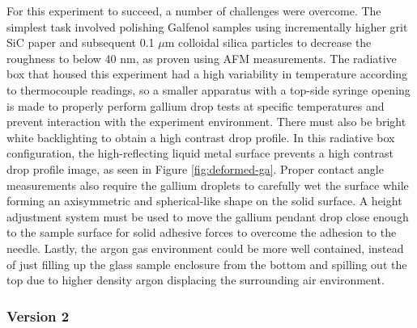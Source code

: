 For this experiment to succeed, a number of challenges were overcome. The simplest task involved polishing Galfenol samples using incrementally higher grit SiC paper and subsequent 0.1 $\mu$m colloidal silica particles to decrease the roughness to below 40 nm, as proven using AFM measurements. %
The radiative box that housed this experiment had a high variability in temperature according to thermocouple readings, so a smaller apparatus with a top-side syringe opening is made to properly perform gallium drop tests at specific temperatures and prevent interaction with the experiment environment. There must also be bright white backlighting to obtain a high contrast drop profile. In this radiative box configuration, the high-reflecting liquid metal surface prevents a high contrast drop profile image, as seen in Figure \ref{fig:deformed-ga}. Proper contact angle measurements also require the gallium droplets to carefully wet the surface while forming an axisymmetric and spherical-like shape on the solid surface. A height adjustment system must be used to move the gallium pendant drop close enough to the sample surface for solid adhesive forces to overcome the adhesion to the needle. Lastly, the argon gas environment could be more well contained, instead of just filling up the glass sample enclosure from the bottom and spilling out the top due to higher density argon displacing the surrounding air environment. 

\subsubsection{Version 2}

